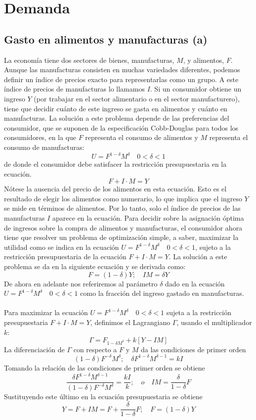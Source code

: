 \section{Demanda}
\subsection{Gasto en alimentos y manufacturas (a)}
La economía tiene dos sectores de bienes, manufacturas, $M$, y alimentos, $F$. Aunque las manufacturas consisten en muchas variedades diferentes, podemos definir un índice de precios exacto para representarlas como un grupo. A este índice de precios de manufacturas lo llamamos $I$. Si un consumidor obtiene un ingreso $Y$ (por trabajar en el sector alimentario o en el sector manufacturero), tiene que decidir cuánto de este ingreso se gasta en alimentos y cuánto en manufacturas. La solución a este problema depende de las preferencias del consumidor, que se suponen de la especificación Cobb-Douglas para todos los consumidores, en la que $F$ representa el consumo de alimentos y $M$ representa el consumo de manufacturas:
$$U=F^{1-\delta}M^\delta\quad 0<\delta<1$$
de donde el consumidor debe satisfacer la restricción presupuestaria en la ecuación.
$$F+I\cdot M = Y$$
Nótese la ausencia del precio de los alimentos en esta ecuación. Esto es el resultado de elegir los alimentos como numerario, lo que implica que el ingreso $Y$ se mide en términos de alimentos. Por lo tanto, solo el índice de precios de las manufacturas $I$ aparece en la ecuación. Para decidir sobre la asignación óptima de ingresos sobre la compra de alimentos y manufacturas, el consumidor ahora tiene que resolver un problema de optimización simple, a saber, maximizar la utilidad como se indica en la ecuación $U=F^{1-\delta}M^\delta\quad 0<\delta<1$, sujeto a la restricción presupuestaria de la ecuación $F+I\cdot M = Y$. La solución a este problema se da en la siguiente ecuación y se derivada como:
$$F=(1-\delta)Y;\quad IM=\delta Y$$
De ahora en adelante nos referiremos al parámetro $\delta$ dado en la ecuación $U=F^{1-\delta}M^\delta\quad 0<\delta<1$ como la fracción del ingreso gastado en manufacturas.\\\\

Para maximizar la ecuación $U=F^{1-\delta}M^\delta\quad 0<\delta<1$ sujeta a la restricción presupuestaria 
$F+I\cdot M = Y$, definimos el Lagrangiano $\Gamma$, usando el multiplicador $k$:
$$\Gamma = F_{1-\delta M^{\delta}}+k[Y-IM]$$
La diferenciación de $\Gamma$ con respecto a $F$ y $M$ da las condiciones de primer orden
$$(1-\delta)F^{-\delta}M^{\delta};\quad \delta F^{1-\delta}M^{\delta-1} = kI$$
Tomando la relación de las condiciones de primer orden se obtiene
$$\dfrac{\delta F^{1-\delta} M^{\delta-1}}{(1-\delta)F^{-\delta} M^{\delta}}=\dfrac{kI}{k}; \quad o \quad IM=\dfrac{\delta}{1-\delta}F$$
Sustituyendo este último en la ecuación presupuestaria se obtiene
$$Y=F+IM=F+\dfrac{\delta}{1-\delta}F;\quad F=(1-\delta)Y$$

